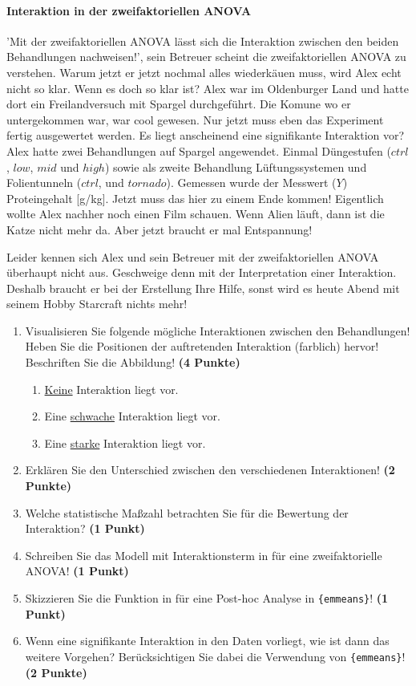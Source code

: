 \documentclass[a4paper, 9pt]{scrartcl}\usepackage[]{graphicx}\usepackage[]{xcolor}
\begin{document}
\ifcollection
\paragraph{Interaktion in der zweifaktoriellen ANOVA}
\fi

'Mit der zweifaktoriellen ANOVA lässt sich die Interaktion zwischen den beiden Behandlungen nachweisen!', sein Betreuer scheint die zweifaktoriellen ANOVA zu verstehen. Warum jetzt er jetzt nochmal alles wiederkäuen muss, wird Alex echt nicht so klar. Wenn es doch so klar ist? Alex war im Oldenburger Land und hatte dort ein Freilandversuch mit Spargel durchgeführt. Die Komune wo er untergekommen war, war cool gewesen. Nur jetzt muss eben das Experiment fertig ausgewertet werden. Es liegt anscheinend eine signifikante Interaktion vor? Alex hatte zwei Behandlungen auf Spargel angewendet. Einmal Düngestufen ($ctrl$, $low$, $mid$ und $high$) sowie als zweite Behandlung Lüftungssystemen und Folientunneln ($ctrl$, und $tornado$). Gemessen wurde der Messwert ($Y$) Proteingehalt [g/kg]. Jetzt muss das hier zu einem Ende kommen! Eigentlich wollte Alex nachher noch einen Film schauen. Wenn Alien läuft, dann ist die Katze nicht mehr da. Aber jetzt braucht er mal Entspannung!

\vspace{1ex}

Leider kennen sich Alex und sein Betreuer mit der zweifaktoriellen ANOVA überhaupt nicht aus. Geschweige denn mit der Interpretation einer Interaktion. Deshalb braucht er bei der Erstellung Ihre Hilfe, sonst wird es heute Abend mit seinem Hobby Starcraft nichts mehr! 

\begin{enumerate}
\item Visualisieren Sie folgende mögliche Interaktionen zwischen den Behandlungen! Heben Sie die Positionen der auftretenden Interaktion (farblich) hervor! Beschriften Sie die Abbildung! \textbf{(4 Punkte)}
\begin{enumerate}
\item \underline{Keine} Interaktion liegt vor.
\item Eine \underline{schwache} Interaktion liegt vor. 
\item Eine \underline{starke} Interaktion liegt vor. 
\end{enumerate}
\item Erklären Sie den Unterschied zwischen den verschiedenen Interaktionen! \textbf{(2 Punkte)}
\item Welche statistische Maßzahl betrachten Sie für die Bewertung der Interaktion? \textbf{(1 Punkt)}
\item Schreiben Sie das Modell mit Interaktionsterm in \Rlogo für eine zweifaktorielle ANOVA! \textbf{(1 Punkt)} 
\item Skizzieren Sie die Funktion in \Rlogo für eine Post-hoc Analyse in \texttt{\{emmeans\}}! \textbf{(1 Punkt)} 
\item Wenn eine signifikante Interaktion in den Daten vorliegt, wie ist dann das weitere Vorgehen? Berücksichtigen Sie dabei die Verwendung von \texttt{\{emmeans\}}! \textbf{(2 Punkte)}
\end{enumerate}
\end{document}
